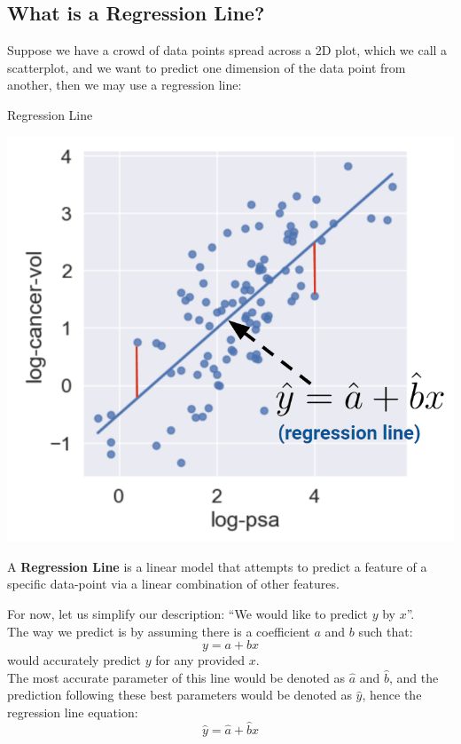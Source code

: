\subsection{What is a Regression Line?}
Suppose we have a crowd of data points spread across a 2D plot, which we call a scatterplot, and we want to predict one dimension of the data point from another, then we may use a regression line:
\begin{ln-define}[sidebyside]{Regression Line}{}
    \begin{center}
        \includegraphics[scale=0.4]{figs/ln01/regression-line.png}
    \end{center}
    \tcblower
    A \textbf{Regression Line} is a linear model that attempts to predict a feature of a specific data-point via a linear combination of other features.
\end{ln-define}
For now, let us simplify our description: ``We would like to predict $y$ by $x$''. \\
The way we predict is by assuming there is a coefficient $a$ and $b$ such that:
\[y = a + bx\]
would accurately predict $y$ for any provided $x$. \\
The most accurate parameter of this line would be denoted as $\hat{a}$ and $\hat{b}$, and the prediction following these best parameters would be denoted as $\hat{y}$, hence the regression line equation:
\[\hat{y} = \hat{a} + \hat{b}x\]

